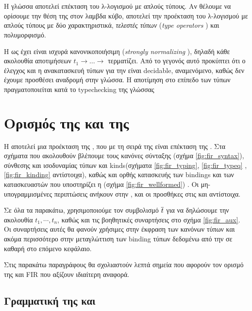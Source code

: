 \section{\FOM}
\label{sec:fom}

Η γλώσσα \FOM{} αποτελεί επέκταση του λ-λογισμού με απλούς τύπους. Αν θέλουμε να ορίσουμε
την θέση της στον λαμβδα κύβο, αποτελεί την προέκταση του λ-λογισμού με απλούς τύπους με
δύο χαρακτηριστικά, \emph{τελεστές τύπων} (\emph{type operators} ) και πολυμορφισμό.

Η \FOM{} ως έχει είναι ισχυρά κανονικοποιήσιμη (\emph{strongly normalizing} ), δηλαδή κάθε ακολουθία
αποτιμήσεων $t_1 \rightarrow \dots \rightarrow $ τερματίζει. Από το  γεγονός αυτό προκύπτει ότι ο έλεγχος
και η ανακατασκευή τύπων για την \FOM{} είναι decidable, αναμενόμενο, καθώς δεν έχουμε προσθέσει αναδρομή στην γλώσσα. Η αποτίμηση στο επίπεδο των τύπων πραγματοποιείται κατά το typechecking
της γλώσσας

\section{Ορισμός της \FOMF{} και της \FIR{}}
\label{sec:fomf}


Η \FIR{} αποτελεί μια προέκταση της \FOMF{}, που με τη σειρά της είναι επέκταση της \FOM{}.
Στα σχήματα που ακολουθούν βλέπουμε τους κανόνες σύνταξης (σχήμα \ref{fig:fir_syntax}), σύνθεσης και
ισοδυναμίας τύπων και kinds(σχήματα \ref{fig:fir_typing}, \ref{fig:fir_typeq} , \ref{fig:fir_kinding} αντίστοιχα), 
καθώς και ορθής κατασκευής των bindings και των κατασκευαστών που υποστηρίζει η \FIR{} (σχήμα 
\ref{fig:fir_wellformed}) . Οι μη-υπογραμμισμένες περιπτώσεις ανήκουν στην \FOM{}, και οι προσθήκες στις \fomfDiff{\FOMF{}} και \firDiff{\FIR{}} αντίστοιχα.

Σε όλα τα παρακάτω, χρησιμοποιούμε τον συμβολισμό $\overline{t}$ για να δηλώσουμε την ακολουθία
$t_1, \cdots, t_n$, καθώς και τις βοηθητικές συναρτήσεις στο σχήμα \ref{fig:fir_aux}. Οι συναρτήσεις
αυτές θα φανούν χρήσιμες στην έκφραση των κανόνων τύπων και ακόμα περισσότερο στην μεταγλώττιση
των binding τύπων δεδομένω από την \FIR{} σε καθαρή \FOMF{} στο επόμενο κεφάλαιο.

Στις παρακάτω παραγράφους θα σχολιαστούν λεπτά σημεία που αφορούν τον ορισμό της \FOMF{} και 
FIR{} που αξίζουν ιδιαίτερη αναφορά.

\subsection{Γραμματική της \FOMF{} και \FIR{} }
\label{subsec:grammar}


